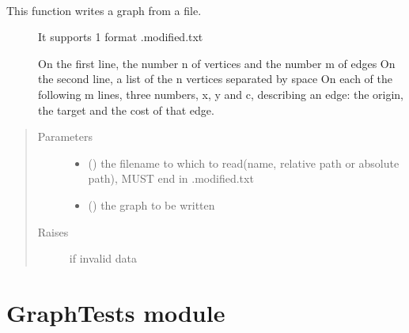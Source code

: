 \documentclass[letterpaper,10pt,english]{sphinxmanual}
\begin{document}
\begin{fulllineitems}
\label{\detokenize{Graph:Graph.write_graph}}~\begin{description}
\item[{This function writes a graph from a file.}] \leavevmode
It supports 1 format
.modified.txt

On the first line, the number n of vertices and the number m of edges
On the second line, a list of the n vertices separated by space
On each of the following m lines, three numbers, x, y and c, describing an edge: the origin, the target and the cost of that edge.

\end{description}
\begin{quote}\begin{description}
\item[{Parameters}] \leavevmode\begin{itemize}
\item {} 
 () \textendash{} the filename to which to read(name, relative path or absolute path), MUST end in .modified.txt

\item {} 
 ({\hyperref[\detokenize{Graph:Graph.Graph}]{}}) \textendash{} the graph to be written

\end{itemize}

\item[{Raises}] \leavevmode
{} \textendash{} if invalid data

\end{description}\end{quote}

\end{fulllineitems}



\section{GraphTests module}
\label{\detokenize{GraphTests:module-GraphTests}}\label{\detokenize{GraphTests:graphtests-module}}\label{\detokenize{GraphTests::doc}}
\end{document}
